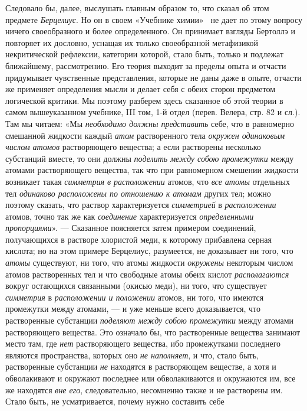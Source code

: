 Следовало бы, далее, выслушать главным образом то, что сказал об этом
предмете {\em Берцелиус}. Но он в своем «Учебнике
химии»~\label{bkm:Ref474666706}
не дает по этому вопросу ничего своеобразного и более определенного. Он
принимает взгляды Бертоллэ и повторяет их дословно, уснащая их только
своеобразной метафизикой некритической рефлексии, категории которой, стало
быть, только и подлежат ближайшему, рассмотрению. Его теория выходит за
пределы опыта и отчасти придумывает чувственные представления, которые не
даны даже в опыте, отчасти же применяет определения мысли и делает себя с
обеих сторон предметом логической критики. Мы поэтому разберем здесь
сказанное об этой теории в самом вышеуказанном учебнике, III том, 1-й отдел
(перев. Велера, стр. 82 и сл.). Там мы читаем: «Мы
{\em необходимо должны представить} себе, что в
равномерно смешанной жидкости каждый {\em атом}
растворенного тела {\em окружен одинаковым числом
атомов} растворяющего вещества; а если растворены несколько субстанций
вместе, то они должны {\em поделить между собою
промежутки} между атомами растворяющего вещества, так что при равномерном
смешении жидкости возникает такая {\em симметрия в
расположении} атомов, что {\em все атомы} отдельных тел
{\em одинаково расположены по отношению к атомам}
других тел; можно поэтому сказать, что раствор характеризуется
{\em симметрией} в
{\em расположении} атомов, точно так же как
{\em соединение} характеризуется
{\em определенными пропорциями}». — Сказанное
поясняется затем примером соединений, получающихся в растворе хлористой
меди, к которому прибавлена серная кислота; но на этом примере Берцелиус,
разумеется, не доказывает ни того, что {\em атомы}
существуют, ни того, что атомы жидкости {\em окружены}
некоторым числом атомов растворенных тел и что свободные атомы обеих кислот
{\em располагаются} вокруг остающихся связанными
(окисью меди), ни того, что существует {\em симметрия}
в {\em расположении и положении} атомов, ни того, что
имеются промежутки между атомами, — и уже меньше всего доказывается, что
растворенные субстанции {\em поделяют между собою
промежутки} между атомами растворяющего вещества. Это означало бы, что
растворенные вещества занимают место там, где {\em нет}
растворяющего вещества, ибо промежутками последнего являются пространства,
которых оно {\em не наполняет}, и что, стало быть,
растворенные субстанции {\em не} находятся в
растворяющем веществе, а хотя и обволакивают и окружают последнее или
обволакиваются и окружаются им, все же находятся
{\em вне его}, следовательно, несомненно также и не
растворены им. Стало быть, не усматривается, почему нужно составить себе
